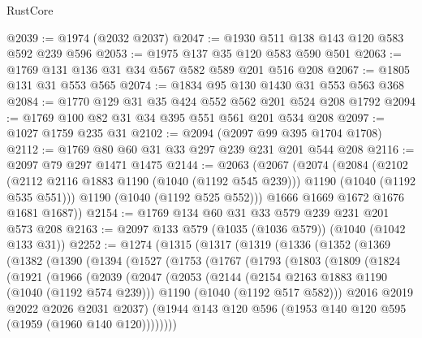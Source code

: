 \begin{lexlean}{RustCore}
\begin{coremodule}
@2039 := @1974 (@2032 @2037)
@2047 := @1930 @511 @138 @143 @120 @583 @592 @239 @596
@2053 := @1975 @137 @35 @120 @583 @590 @501
@2063 := @1769 @131 @136 @31 @34 @567 @582 @589 @201 @516 @208
@2067 := @1805 @131 @31 @553 @565
@2074 := @1834 @95 @130 @1430 @31 @553 @563 @368
@2084 := @1770 @129 @31 @35 @424 @552 @562 @201 @524 @208 @1792
@2094 := @1769 @100 @82 @31 @34 @395 @551 @561 @201 @534 @208
@2097 := @1027 @1759 @235 @31
@2102 := @2094 (@2097 @99 @395 @1704 @1708)
@2112 := @1769 @80 @60 @31 @33 @297 @239 @231 @201 @544 @208
@2116 := @2097 @79 @297 @1471 @1475
@2144 := @2063
    (@2067
      (@2074
        (@2084
          (@2102
            (@2112 @2116 @1883 @1190 (@1040 (@1192 @545 @239)))
            @1190
            (@1040 (@1192 @535 @551)))
          @1190
          (@1040 (@1192 @525 @552)))
        @1666
        @1669
        @1672
        @1676
        @1681
        @1687))
@2154 := @1769 @134 @60 @31 @33 @579 @239 @231 @201 @573 @208
@2163 := @2097 @133 @579 (@1035 (@1036 @579)) (@1040 (@1042 @133 @31))
@2252 := @1274
    (@1315
      (@1317
        (@1319
          (@1336
            (@1352
              (@1369
                (@1382
                  (@1390
                    (@1394
                      (@1527
                        (@1753
                          (@1767
                            (@1793
                              (@1803
                                (@1809
                                  (@1824
                                    (@1921
                                      (@1966
                                        (@2039
                                          (@2047
                                            (@2053
                                              (@2144
                                                (@2154 @2163 @1883 @1190 (@1040 (@1192 @574 @239)))
                                                @1190
                                                (@1040 (@1192 @517 @582)))
                                              @2016
                                              @2019
                                              @2022
                                              @2026
                                              @2031
                                              @2037)
                                            (@1944
                                              @143
                                              @120
                                              @596
                                              (@1953 @140 @120 @595 (@1959 (@1960 @140 @120))))))))

\end{coremodule}
\end{lexlean}
